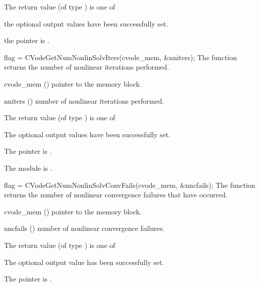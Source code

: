 {
  The return value  (of type ) is one of
  \begin{args}
  \item[\Id{CV\_SUCCESS}]
    the optional output values have been successfully set.
  \item[\Id{CV\_MEM\_NULL}]
    the  pointer is .
  \end{args}
}
{}
{
  flag = CVodeGetNumNonlinSolvIters(cvode\_mem, \&nniters);
}
{
  The function  returns the
  number of nonlinear iterations performed.
}
{
  \begin{args}
  \item[cvode\_mem] ()
    pointer to the {\cvodes} memory block.
  \item[nniters] ()
    number of nonlinear iterations performed.
  \end{args}
}
{
  The return value  (of type ) is one of
  \begin{args}
  \item[\Id{CV\_SUCCESS}]
    The optional output values have been successfully set.
  \item[\Id{CV\_MEM\_NULL}]
    The  pointer is .
  \item[\Id{CV\_MEM\_FAIL}]
    The {\sunnonlinsol} module is .
  \end{args}
}
{}
{
  flag = CVodeGetNumNonlinSolvConvFails(cvode\_mem, \&nncfails);
}
{
  The function  returns the
  number of nonlinear convergence failures that have occurred.
}
{
  \begin{args}
  \item[cvode\_mem] ()
    pointer to the {\cvodes} memory block.
  \item[nncfails] ()
    number of nonlinear convergence failures.
  \end{args}
}
{
  The return value  (of type ) is one of
  \begin{args}
  \item[\Id{CV\_SUCCESS}]
    The optional output value has been successfully set.
  \item[\Id{CV\_MEM\_NULL}]
    The  pointer is .
  \end{args}
}
{}
